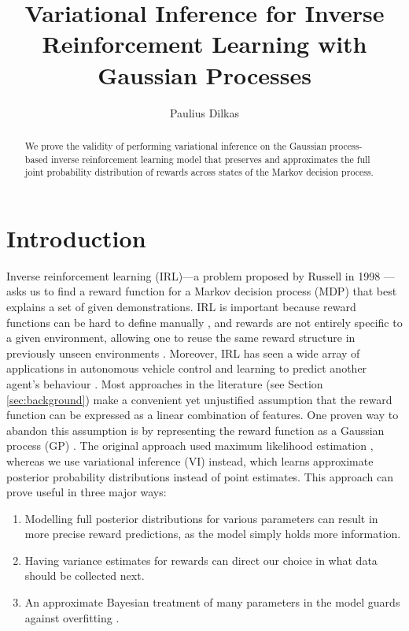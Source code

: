 \documentclass{mpaper}
\begin{document}

\title{Variational Inference for Inverse Reinforcement Learning with Gaussian Processes}
\author{Paulius Dilkas}
\maketitle

\begin{abstract}
  We prove the validity of performing variational inference on the Gaussian
  process-based inverse reinforcement learning model that preserves and
  approximates the full joint probability distribution of rewards across states
  of the Markov decision process.
\end{abstract}

\section{Introduction}

Inverse reinforcement learning (IRL)---a problem proposed by Russell in
1998 \cite{DBLP:conf/colt/Russell98}---asks us to find a reward function for a
Markov decision process (MDP) that best explains a set of given demonstrations.
IRL is important because reward functions can be hard to define manually
\cite{DBLP:conf/icml/PieterN04,DBLP:journals/corr/abs-1806-06877}, and rewards
are not entirely specific to a given environment, allowing one to reuse the same
reward structure in previously unseen environments
\cite{DBLP:journals/corr/abs-1806-06877,DBLP:conf/uai/JinDAS17,DBLP:conf/nips/LevinePK11}.
Moreover, IRL has seen a wide array of applications in autonomous vehicle
control \cite{DBLP:journals/ijsr/KimP16,DBLP:journals/ijrr/KretzschmarSSB16} and
learning to predict another agent's behaviour
\cite{DBLP:journals/ai/BogertD18,DBLP:conf/aaai/VogelRGR12,ziebart2008maximum,DBLP:conf/huc/ZiebartMDB08,DBLP:conf/iros/ZiebartRGMPBHDS09}.
Most approaches in the literature (see Section \ref{sec:background}) make a
convenient yet unjustified assumption that the reward function can be expressed
as a linear combination of features. One proven way to abandon this assumption
is by representing the reward function as a Gaussian process (GP)
\cite{DBLP:conf/uai/JinDAS17,DBLP:conf/nips/LevinePK11,DBLP:journals/corr/abs-1208-2112}.
The original approach used maximum likelihood estimation
\cite{DBLP:conf/nips/LevinePK11}, whereas we use variational inference (VI)
instead, which learns approximate posterior probability distributions instead of
point estimates. This approach can prove useful in three major ways:
\begin{enumerate}
\item Modelling full posterior distributions for various parameters can result
  in more precise reward predictions, as the model simply holds more
  information.
\item Having variance estimates for rewards can direct our choice in what data
  should be collected next.
\item An approximate Bayesian treatment of many parameters in the model guards
  against overfitting \cite{DBLP:conf/uai/JinDAS17}.
\end{enumerate}
\end{document}
